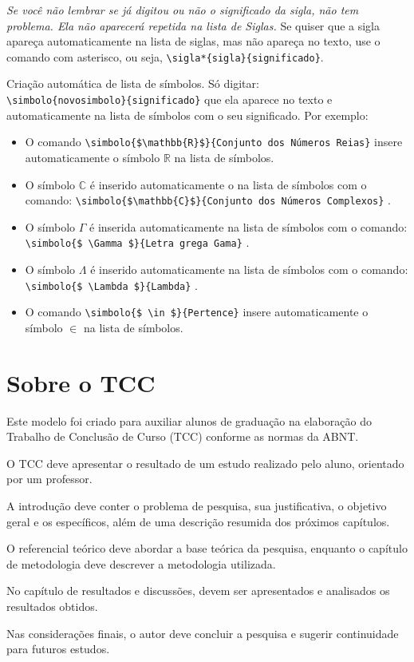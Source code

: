 \begin{description}
    \textit{Se você não lembrar se já digitou ou não o significado da sigla, não tem problema. Ela não aparecerá repetida na lista de Siglas.} Se quiser que a sigla apareça automaticamente na lista de siglas, mas não apareça no texto, use o comando com asterisco, ou seja, \verb|\sigla*{sigla}{significado}|.
    \item[31/07/2024: ] Criação automática de lista de símbolos. Só digitar:\\  \verb|\simbolo{novosimbolo}{significado}| que ela aparece no texto e automaticamente na lista de símbolos com o seu significado. Por exemplo:
     \begin{itemize}
         \item O comando  \verb|\simbolo{$\mathbb{R}$}{Conjunto dos Números Reias}|  insere automaticamente o símbolo $\mathbb{R}$ na lista de símbolos.
         \item O símbolo $\mathbb{C}$ é inserido automaticamente o  na lista de símbolos com o comando:  \verb|\simbolo{$\mathbb{C}$}{Conjunto dos Números Complexos}| .
         \item O símbolo $ \Gamma $ é inserida automaticamente na lista de símbolos com o comando: \verb|\simbolo{$ \Gamma $}{Letra grega Gama}| .
        \item O símbolo $ \Lambda  $ é inserido automaticamente na lista de símbolos com o comando: \verb|\simbolo{$ \Lambda $}{Lambda}| .
        \item O comando  \verb|\simbolo{$ \in $}{Pertence}|  insere automaticamente o símbolo $ \in $ na lista de símbolos. 
      \end{itemize}  
\end{description}


\section{Sobre o TCC}\label{sec:motivacao}
Este modelo foi criado para auxiliar alunos de graduação na elaboração do Trabalho de Conclusão de Curso (TCC) conforme as normas da ABNT. 

O TCC deve apresentar o resultado de um estudo realizado pelo aluno, orientado por um professor. 

A introdução deve conter o problema de pesquisa, sua justificativa, o objetivo geral e os específicos, além de uma descrição resumida dos próximos capítulos. 

O referencial teórico deve abordar a base teórica da pesquisa, enquanto o capítulo de metodologia deve descrever a metodologia utilizada. 

No capítulo de resultados e discussões, devem ser apresentados e analisados os resultados obtidos. 

Nas considerações finais, o autor deve concluir a pesquisa e sugerir continuidade para futuros estudos.



